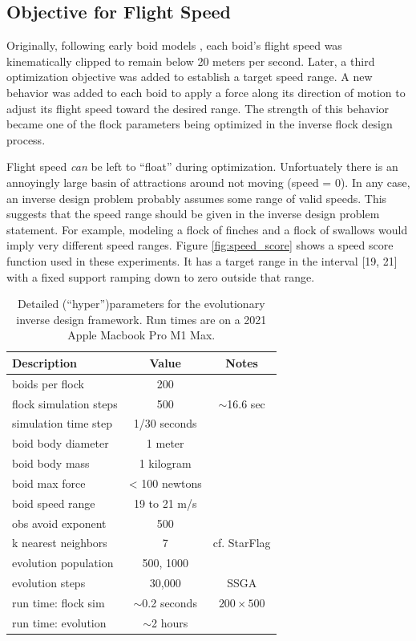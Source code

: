 \documentclass[letterpaper]{article}
\begin{document}
\subsection{Objective for Flight Speed}
\label{subsec:speed_objective}

Originally, following early boid models \citep{reynolds_flocks_1987}, each boid's flight speed was kinematically clipped to remain below 20 meters per second. Later, a third optimization objective was added to establish a target speed range. A new behavior was added to each boid to apply a force along its direction of motion to adjust its flight speed toward the desired range. The strength of this behavior became one of the flock parameters being optimized in the inverse flock design process.

Flight speed \textit{can} be left to “float” during optimization. Unfortuately there is an annoyingly large basin of attractions around not moving (speed = 0). In any case, an inverse design problem probably assumes some range of valid speeds. This suggests that the speed range should be given in the inverse design problem statement. For example, modeling a flock of finches and a flock of swallows would imply very different speed ranges. Figure \ref{fig:speed_score} shows a speed score function used in these experiments. It has a target range in the interval [19, 21] with a fixed support ramping down to zero outside that range.



\begin{table}[b]
\centering
\begin{tabular}{ | l | c | c | }
    \hline
    \textbf{Description} & \textbf{Value} & \textbf{Notes} \\
    \hline
    boids per flock & 200 &  \\
    flock simulation steps & 500 & $\sim$16.6 sec \\
    simulation time step & 1/30 seconds & \\
    \hline
    boid body diameter & 1 meter & \\
    boid body mass & 1 kilogram & \\
    boid max force & < 100 newtons & \\
    boid speed range & 19 to 21 m/s & \\
    obs avoid exponent & 500 & \\
    k nearest neighbors & 7 & cf. StarFlag \\
    \hline
    evolution population & 500, 1000 & \\
    evolution steps & 30,000 & SSGA \\
    \hline
    run time: flock sim & $\sim$0.2 seconds & $200{\times}500$ \\
    run time: evolution & $\sim$2 hours & \\
    \hline
\end{tabular}
\caption{Detailed (``hyper'')parameters for the evolutionary inverse design framework. Run times are on a 2021 Apple Macbook Pro M1 Max.}
\label{table:HyperParameters}
\end{table}
\end{document}
